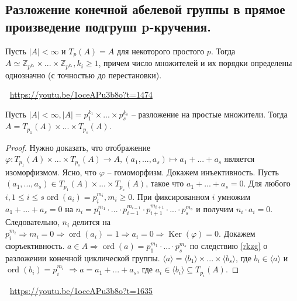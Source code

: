 \subsection{Разложение конечной абелевой группы в прямое произведение подгрупп p-кручения.}
\begin{statement}
    Пусть $|A| < \infty$ и $T_p(A) = A$ для некоторого простого $p$.
    Тогда $A \simeq \mathbb{Z}_{p^{k_1}} \times ... \times \mathbb{Z}_{p^{k_s}}, k_i \geqslant 1$, причем число множителей и их порядки определены однозначно (с точностью до перестановки).
\end{statement}
\large \faYoutube \normalsize $\>$ \url{https://youtu.be/1oceAPu3b8o?t=1474}
\begin{statement}
    Пусть $|A| < \infty, |A| = p_1^{k_1} \times ... \times p_s^{k_s}$ -- разложение на простые множители. Тогда $A = T_{p_1}(A) \times ... \times T_{p_s}(A)$.
    \begin{proof}
        Нужно доказать, что отображение $\varphi : T_{p_1}(A) \times ... \times T_{p_s}(A) \to A, (a_1, ..., a_s) \mapsto a_1 + ... + a_s$ является изоморфизмом. Ясно, что $\varphi$ -- гомоморфизм. Докажем инъективность. Пусть $(a_1, ..., a_s) \in T_{p_1}(A) \times ... \times T_{p_s}(A)$, такое что $a_1 + ... + a_s = 0$. Для любого $i, 1 \leqslant i \leqslant s \operatorname{ord}(a_i) = p_i^{m_i}, m_i \geqslant 0$. При фиксированном $i$ умножим $a_1 + ... + a_s = 0$ на $n_i = p_1^{m_1} \cdot ... \cdot p_{i-1}^{m_{i-1}} \cdot p_{i+1}^{m_{i+1}} \cdot ... \cdot p_s^{m_s}$ и получим $n_i \cdot a_i = 0$. Следовательно, $n_i$ делится на $p_i^{m_i} \Rightarrow m_i = 0 \Rightarrow \operatorname{ord}(a_i) = 1 \Rightarrow a_i = 0 \Rightarrow \operatorname{Ker}(\varphi) = 0$. Докажем сюръективность. $a \in A \Rightarrow \operatorname{ord}(a) = p_1^{m_1} \cdot ... \cdot p_s^{m_s}$ по следствию \ref{rkzg} о разложении конечной циклической группы.
        $\langle a \rangle = \langle b_1 \rangle \times ... \times \langle b_s \rangle$, где $b_i \in \langle a \rangle$ и $\operatorname{ord}(b_i) = p_i^{m_i}$ $\Rightarrow a = a_1 + ... + a_s$, где $a_i \in \langle b_i \rangle \subseteq T_{p_i}(A)$.
    \end{proof}
\end{statement}
\large \faYoutube \normalsize $\>$ \url{https://youtu.be/1oceAPu3b8o?t=1635}
